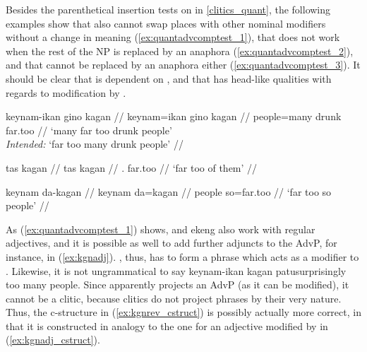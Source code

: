 Besides the parenthetical insertion tests on  in
\autoref{clitics_quant}, the following examples show that 
also cannot swap places with other nominal modifiers without a change in
meaning (\ref{ex:quantadvcomptest_1}), that  does not work
when the rest of the NP is replaced by an anaphora
(\ref{ex:quantadvcomptest_2}), and that  cannot be replaced
by an anaphora either (\ref{ex:quantadvcomptest_3}). It should be
clear that  is dependent on , and that 
 has head-like qualities with regards to modification by
.

\pex\label{ex:quantadvcomptest}
\a\ljudge\excl\label{ex:quantadvcomptest_1}\begingl
	\gla keynam-ikan gino kagan //
	\glb keynam=ikan gino kagan //
	\glc people=many drunk far.too //
	\glft `many far too drunk people'\\
		\textit{Intended:} `far too many drunk people' //
\endgl

\a\ljudge*\label{ex:quantadvcomptest_2}\begingl
	\gla tas kagan //
	\glb tas kagan //
	\glc \TplM{}.\Parg{} far.too //
	\glft `far too of them' //
\endgl

\a\ljudge*\label{ex:quantadvcomptest_3}\begingl
	\gla keynam da-kagan //
	\glb keynam da=kagan //
	\glc people so=far.too //
	\glft `far too so people' //
\endgl

\xe

As (\ref{ex:quantadvcomptest_1}) shows,  and 
{ekeng} also work with regular adjectives, and it is possible as well to add
further adjuncts to the AdvP, for instance,  in
(\ref{ex:kgnadj}). , thus, has to
form a phrase which acts as a modifier to . Likewise,
it is not ungrammatical to say  {keynam-ikan kagan
patu}{surprisingly too many people}. Since  apparently
projects an AdvP (as it can be modified), it cannot be a clitic, because
clitics do not project phrases by their very nature. Thus, the c-structure in
(\ref{ex:kgnrev_cstruct}) is possibly actually more correct, in that it is
constructed in analogy to the one for an adjective modified by
 in (\ref{ex:kgnadj_cstruct}).

